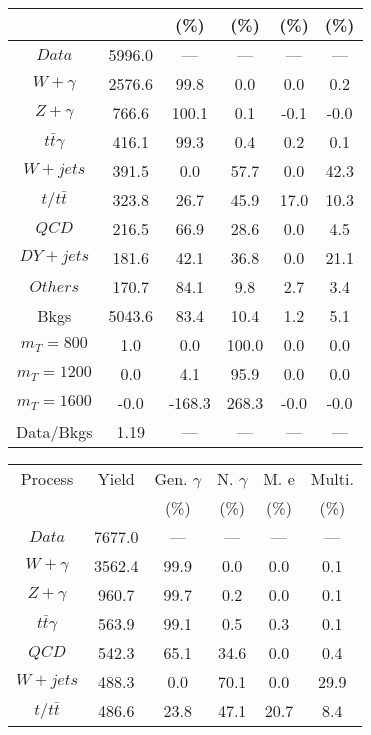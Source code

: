 \begin{figure}
\begin{minipage}[c]{0.32\textwidth}
{\begin{tabular}{cccccc}
 &  & (\%) & (\%) & (\%) & (\%)  \\
\hline
                                                                      $ Data $ &  5996.0 &  --- &  --- &  --- &  ---\\
$ W+\gamma $ &  2576.6 &  99.8 &  0.0 &  0.0 &  0.2\\
$ Z+\gamma $ &  766.6 &  100.1 &  0.1 &  -0.1 &  -0.0\\
$ t\bar{t}\gamma $ &  416.1 &  99.3 &  0.4 &  0.2 &  0.1\\
$ W+jets $ &  391.5 &  0.0 &  57.7 &  0.0 &  42.3\\
$ t/t\bar{t} $ &  323.8 &  26.7 &  45.9 &  17.0 &  10.3\\
$ QCD $ &  216.5 &  66.9 &  28.6 &  0.0 &  4.5\\
$ DY+jets $ &  181.6 &  42.1 &  36.8 &  0.0 &  21.1\\
$ Others $ &  170.7 &  84.1 &  9.8 &  2.7 &  3.4\\
Bkgs &  5043.6 &  83.4 &  10.4 &  1.2 &  5.1\\
$ m_{T} = 800 $ &  1.0 &  0.0 &  100.0 &  0.0 &  0.0\\
$ m_{T} = 1200 $ &  0.0 &  4.1 &  95.9 &  0.0 &  0.0\\
$ m_{T} = 1600 $ &  -0.0 &  -168.3 &  268.3 &  -0.0 &  -0.0\\
Data/Bkgs &  1.19 &  --- &  --- &  --- &  ---\\
\hline
\end{tabular}
}
\end{minipage}
\begin{minipage}[c]{0.32\textwidth}
\centering
\tiny{
\begin{tabular}{cccccc}
\hline
Process & Yield & Gen. $\gamma$ & N. $\gamma$ & M. e & Multi. \\
 &  & (\%) & (\%) & (\%) & (\%)  \\
\hline
                                                                      $ Data $ &  7677.0 &  --- &  --- &  --- &  ---\\
$ W+\gamma $ &  3562.4 &  99.9 &  0.0 &  0.0 &  0.1\\
$ Z+\gamma $ &  960.7 &  99.7 &  0.2 &  0.0 &  0.1\\
$ t\bar{t}\gamma $ &  563.9 &  99.1 &  0.5 &  0.3 &  0.1\\
$ QCD $ &  542.3 &  65.1 &  34.6 &  0.0 &  0.4\\
$ W+jets $ &  488.3 &  0.0 &  70.1 &  0.0 &  29.9\\
$ t/t\bar{t} $ &  486.6 &  23.8 &  47.1 &  20.7 &  8.4\\

\end{tabular}}
\end{minipage}
\end{figure}
